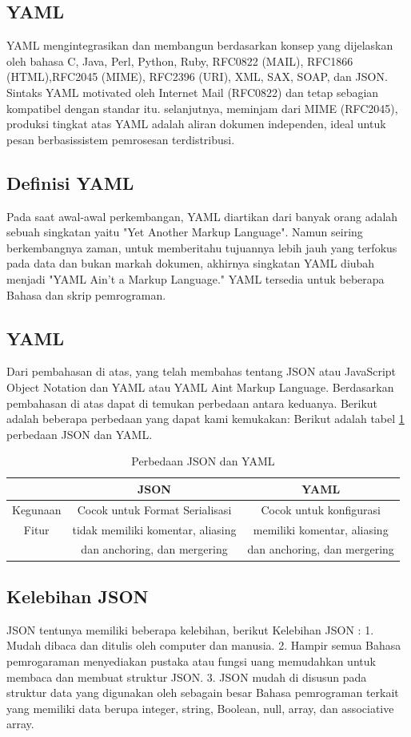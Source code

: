 \documentclass[a4paper]{article}
\begin{document}
\subsection{YAML}
YAML mengintegrasikan dan membangun berdasarkan konsep yang dijelaskan oleh bahasa C, Java, Perl, Python, Ruby, RFC0822 (MAIL), RFC1866 (HTML),RFC2045 (MIME), RFC2396 (URI), XML, SAX, SOAP, dan JSON.
Sintaks YAML motivated oleh Internet Mail (RFC0822) dan tetap sebagian kompatibel dengan standar itu. selanjutnya, meminjam dari MIME (RFC2045), produksi tingkat atas YAML adalah aliran dokumen independen, ideal untuk pesan berbasissistem pemrosesan terdistribusi.
\subsection{Definisi YAML}
Pada saat awal-awal perkembangan, YAML diartikan dari banyak orang adalah sebuah singkatan yaitu "Yet Another Markup Language". Namun seiring berkembangnya zaman, untuk memberitahu tujuannya lebih jauh yang terfokus pada data dan bukan markah dokumen, akhirnya singkatan YAML diubah menjadi "YAML Ain't a Markup Language." YAML tersedia untuk beberapa Bahasa dan skrip pemrograman.
\subsection{YAML}
Dari pembahasan di atas, yang telah membahas tentang JSON atau JavaScript Object Notation dan YAML atau YAML Aint Markup Language. Berdasarkan pembahasan di atas dapat di temukan perbedaan antara keduanya. Berikut adalah beberapa perbedaan yang dapat kami kemukakan:
Berikut adalah tabel \ref{table:perbedaan} perbedaan JSON dan YAML.
\begin{table}[h]
\caption{Perbedaan JSON dan YAML}

\centering
\begin{tabular}{ccc}
\hline
&JSON&YAML\\
\hline
Kegunaan&Cocok untuk Format Serialisasi&Cocok untuk konfigurasi\\
\hline
Fitur&tidak memiliki komentar, aliasing&memiliki komentar, aliasing \\
&dan anchoring, dan  mergering& dan anchoring, dan  mergering\\
\hline
\end{tabular}
\label{table:perbedaan}
\end{table}

\subsection{Kelebihan JSON}
JSON tentunya memiliki beberapa kelebihan, berikut Kelebihan JSON :
1.	Mudah dibaca dan ditulis oleh computer dan manusia.
2.	Hampir semua Bahasa pemrogaraman menyediakan pustaka atau fungsi uang memudahkan untuk membaca dan membuat struktur JSON.
3.	JSON mudah di disusun pada struktur data yang digunakan oleh sebagain besar Bahasa pemrograman terkait yang memiliki data berupa integer, string, Boolean, null, array, dan associative array.
\end{document}
